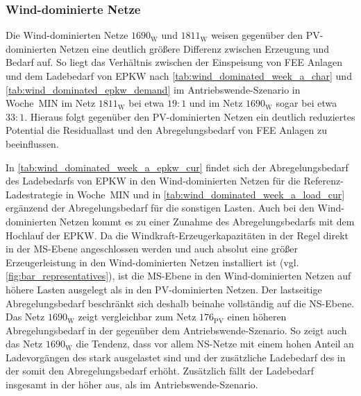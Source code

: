 \subsubsection{Wind-dominierte Netze}\label{chap:wind_cur_results}

Die Wind-dominierten Netze \(1690_{\text{W}}\) und \(1811_{\text{W}}\) weisen gegenüber den \gls{PV}-dominierten Netzen eine deutlich größere Differenz zwischen Erzeugung und Bedarf auf.
So liegt das Verhältnis zwischen der Einspeisung von \gls{FEE} Anlagen und dem Ladebedarf von \gls{EPKW} nach \autoref{tab:wind_dominated_week_a_char} und \autoref{tab:wind_dominated_epkw_demand} im Antriebswende-Szenario in Woche~MIN im Netz \(1811_{\text{W}}\) bei etwa \(19:1\) und im Netz \(1690_{\text{W}}\) sogar bei etwa \(33:1\).
Hieraus folgt gegenüber den \gls{PV}-dominierten Netzen ein deutlich reduziertes Potential die Residuallast und den Abregelungsbedarf von \gls{FEE} Anlagen zu beeinflussen.





In \autoref{tab:wind_dominated_week_a_epkw_cur} findet sich der Abregelungsbedarf des Ladebedarfs von \gls{EPKW} in den Wind-dominierten Netzen für die Referenz-Ladestrategie in Woche~MIN und in \autoref{tab:wind_dominated_week_a_load_cur} ergänzend der Abregelungsbedarf für die sonstigen Lasten.
Auch bei den Wind-dominierten Netzen kommt es zu einer Zunahme des Abregelungsbedarfs mit dem Hochlauf der \gls{EPKW}.
Da die Windkraft-Erzeugerkapazitäten in der Regel direkt in der \gls{MS}-Ebene angeschlossen werden und auch absolut eine größer Erzeugerleistung in den Wind-dominierten Netzen installiert ist (vgl. \autoref{fig:bar_representatives}), ist die \gls{MS}-Ebene in den Wind-dominierten Netzen auf höhere Lasten ausgelegt als in den \gls{PV}-dominierten Netzen.
Der lastseitige Abregelungsbedarf beschränkt sich deshalb beinahe vollständig auf die \gls{NS}-Ebene.
Das Netz \(1690_{\text{W}}\) zeigt vergleichbar zum Netz \(176_{\text{PV}}\) einen höheren Abregelungsbedarf in der \SzeFirmenparkplatz gegenüber dem Antriebswende-Szenario.
So zeigt auch das Netz \(1690_{\text{W}}\) die Tendenz, dass vor allem \gls{NS}-Netze mit einem hohen Anteil an Ladevorgängen des \UC \zH stark ausgelastet sind und der zusätzliche Ladebedarf des \UC \zH in der \SzeFirmenparkplatz somit den Abregelungsbedarf erhöht.
Zusätzlich fällt der Ladebedarf insgesamt in der \SzeFirmenparkplatz höher aus, als im Antriebswende-Szenario.

